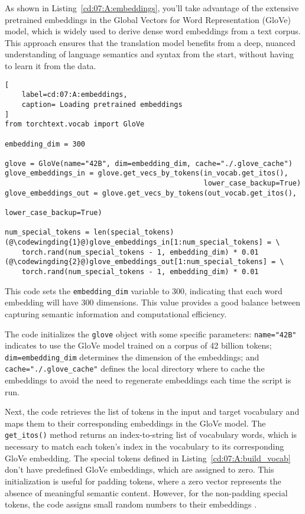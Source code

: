 As shown in Listing~\ref{cd:07:A:embeddings}, you'll take advantage of the extensive pretrained embeddings in the Global Vectors for Word Representation (GloVe) model, which is widely used to derive dense word embeddings from a text corpus. This approach ensures that the translation model benefits from a deep, nuanced understanding of language semantics and syntax from the start, without having to learn it from the data.
\begin{lstlisting}[
    label=cd:07:A:embeddings,
    caption= Loading pretrained embeddings
]
from torchtext.vocab import GloVe

embedding_dim = 300

glove = GloVe(name="42B", dim=embedding_dim, cache="./.glove_cache")
glove_embeddings_in = glove.get_vecs_by_tokens(in_vocab.get_itos(), 
                                               lower_case_backup=True)
glove_embeddings_out = glove.get_vecs_by_tokens(out_vocab.get_itos(), 
                                                lower_case_backup=True)

num_special_tokens = len(special_tokens)
(@\codewingding{1}@)glove_embeddings_in[1:num_special_tokens] = \
    torch.rand(num_special_tokens - 1, embedding_dim) * 0.01
(@\codewingding{2}@)glove_embeddings_out[1:num_special_tokens] = \
    torch.rand(num_special_tokens - 1, embedding_dim) * 0.01
\end{lstlisting}
This code sets the \lstinline{embedding_dim} variable to 300, indicating that each word embedding will have 300 dimensions. This value provides a good balance between capturing semantic information and computational efficiency.

The code initializes the \lstinline{glove} object with some specific parameters: \lstinline{name="42B"} indicates to use the GloVe model trained on a corpus of 42 billion tokens; \lstinline{dim=embedding_dim} determines the dimension of the embeddings; and \lstinline{cache="./.glove_cache"} defines the local directory where to cache the embeddings to avoid the need to regenerate embeddings each time the script is run. 

Next, the code retrieves the list of tokens in the input and target vocabulary  and maps them  to their corresponding embeddings in the GloVe model. The \lstinline{get_itos()} method returns an index-to-string list of vocabulary words, which is necessary to match each token's index in the vocabulary to its corresponding GloVe embedding.
The special tokens defined in Listing~\ref{cd:07:A:build_vocab} don't have predefined GloVe embeddings, which are assigned to zero. This initialization is useful for padding tokens, where a zero vector represents the absence of meaningful semantic content. However, for the non-padding special tokens, the code assigns small random numbers to their embeddings .

